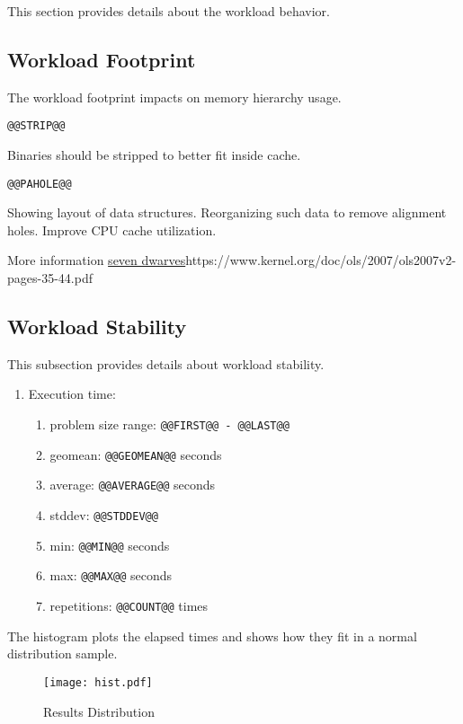 \documentclass[a4paper]{article}
\begin{document}
This section provides details about the workload behavior.

\subsection{Workload Footprint}

The workload footprint impacts on memory hierarchy usage.

\begin{verbatim}
@@STRIP@@
\end{verbatim}

Binaries should be stripped to better fit inside cache.

\begin{verbatim}
@@PAHOLE@@
\end{verbatim}

Showing layout of data structures.
Reorganizing such data to remove alignment holes.
Improve CPU cache utilization.

More information \url{seven dwarves}{https://www.kernel.org/doc/ols/2007/ols2007v2-pages-35-44.pdf}

\subsection{Workload Stability}

This subsection provides details about workload stability.

\begin{enumerate}
\item Execution time:
\begin{enumerate}
\item problem size range: {\tt @@FIRST@@ - @@LAST@@}
\item geomean: {\tt @@GEOMEAN@@} seconds
\item average: {\tt @@AVERAGE@@} seconds
\item stddev: {\tt @@STDDEV@@}
\item min: {\tt @@MIN@@} seconds
\item max: {\tt @@MAX@@} seconds
\item repetitions: {\tt @@COUNT@@} times
\end{enumerate}
\end{enumerate}

The histogram plots the elapsed times and shows how they fit in a normal distribution sample.

\begin{figure}[H]
\label{fig:histogram}
\centering
\texttt{[image: hist.pdf]}
\caption{Results Distribution}
\end{figure}
\end{document}
